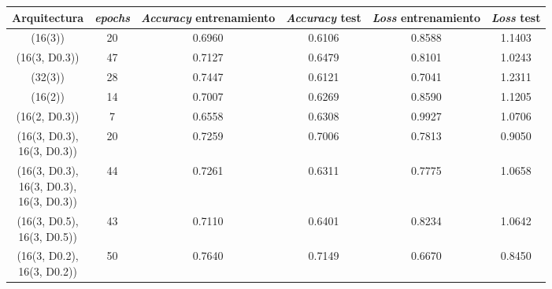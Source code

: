 \documentclass{uc3mpracticas}
\begin{document}
\begin{figure}[!h]
\begin{center}
  \begin{tabular}{|c|c|c|c|c|c|}
    \hline
    \rowcolor{Gray}
        \textbf{Arquitectura} & \textbf{\textit{epochs}}& \textbf{\textit{Accuracy} entrenamiento} & \textbf{\textit{Accuracy} test} & \textbf{\textit{Loss} entrenamiento} & \textbf{\textit{Loss} test}\\ \hline \hline
        (16(3))               & 20                      &  0.6960                                  &  0.6106                         &  0.8588                              &  1.1403            \\ \hline
        (16(3, D0.3))         & 47                      &  0.7127                                  &  0.6479                         &  0.8101                              &  1.0243            \\ \hline
        (32(3))               & 28                      &  0.7447                                  &  0.6121                         &  0.7041                              &  1.2311            \\ \hline
        (16(2))               & 14                      &  0.7007                                  &  0.6269                         &  0.8590                              &  1.1205            \\ \hline
        (16(2, D0.3))         & 7                       &  0.6558                                  &  0.6308                         &  0.9927                              &  1.0706            \\ \hline
        \makecell{(16(3, D0.3), \\ 16(3, D0.3))} & 20   &  0.7259                                  &  0.7006                         &  0.7813                              &  0.9050            \\ \hline
        \makecell{(16(3, D0.3), \\ 16(3, D0.3), \\ 16(3, D0.3))} & 44   &  0.7261                  &  0.6311                         &  0.7775                              &  1.0658            \\ \hline
        \makecell{(16(3, D0.5), \\ 16(3, D0.5))} & 43   &  0.7110                                  &  0.6401                         &  0.8234                              &  1.0642            \\ \hline
        \makecell{(16(3, D0.2), \\ 16(3, D0.2))} & 50   &  0.7640                                  &  0.7149                         &  0.6670                              &  0.8450            \\ \hline

\end{tabular}
\end{center}
\end{figure}
\end{document}
